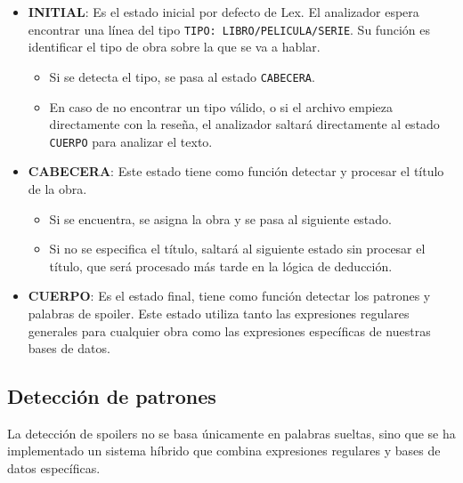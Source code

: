 \documentclass{article}
\begin{document}
\begin{itemize}
    \item \textbf{INITIAL}: Es el estado inicial por defecto de Lex. El analizador espera encontrar una línea del tipo \texttt{TIPO: LIBRO/PELICULA/SERIE}. Su función es identificar el tipo de obra sobre la que se va a hablar.
    \begin{itemize}
        \item Si se detecta el tipo, se pasa al estado \texttt{CABECERA}.
        \item En caso de no encontrar un tipo válido, o si el archivo empieza directamente con la reseña, el analizador saltará directamente al estado \texttt{CUERPO} para analizar el texto.
    \end{itemize}
    
    \item \textbf{CABECERA}: Este estado tiene como función detectar y procesar el título de la obra.
    \begin{itemize}
        \item Si se encuentra, se asigna la obra y se pasa al siguiente estado.
        \item Si no se especifica el título, saltará al siguiente estado sin procesar el título, que será procesado más tarde en la lógica de deducción.
    \end{itemize}
    
    \item \textbf{CUERPO}: Es el estado final, tiene como función detectar los patrones y palabras de spoiler. Este estado utiliza tanto las expresiones regulares generales para cualquier obra como las expresiones específicas de nuestras bases de datos.
\end{itemize}

\subsection{Detección de patrones}

La detección de spoilers no se basa únicamente en palabras sueltas, sino que se ha implementado un sistema híbrido que combina expresiones regulares y bases de datos específicas.
\end{document}
